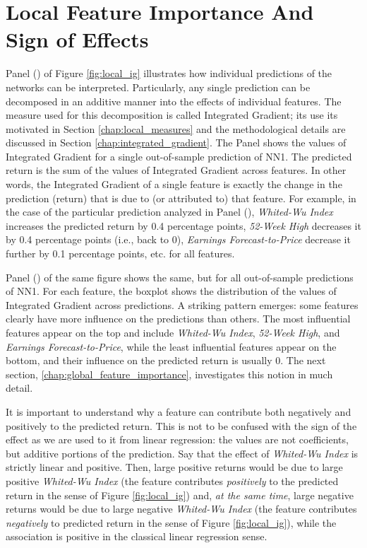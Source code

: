 \section {Local Feature Importance And Sign of Effects}
	\label{chap:local_feature_importance}

	Panel () of Figure \ref{fig:local_ig} illustrates how individual predictions of the networks can be interpreted. Particularly, any single prediction can be decomposed in an additive manner into the effects of individual features. The measure used for this decomposition is called Integrated Gradient; its use its motivated in Section \ref{chap:local_measures} and the methodological details are discussed in Section \ref{chap:integrated_gradient}. The Panel shows the values of Integrated Gradient for a single out-of-sample prediction of NN1. The predicted return is the sum of the values of Integrated Gradient across features. In other words, the Integrated Gradient of a single feature is exactly the change in the prediction (return) that is due to (or attributed to) that feature. For example, in the case of the particular prediction analyzed in Panel (),\textit{ Whited-Wu Index} increases the predicted return by 0.4 percentage points, \textit{52-Week High} decreases it by 0.4 percentage points (i.e., back to 0), \textit{Earnings Forecast-to-Price} decrease it further by 0.1 percentage points, etc. for all features. 
	
	Panel () of the same figure shows the same, but for all out-of-sample predictions of NN1. For each feature, the boxplot shows the distribution of the values of Integrated Gradient across predictions. 
	A striking pattern emerges: some features clearly have more influence on the predictions than others. The most influential features appear on the top and include \textit{Whited-Wu Index}, \textit{52-Week High}, and \textit{Earnings Forecast-to-Price}, while the least influential features appear on the bottom, and their influence on the predicted return is usually 0. The next section, \ref{chap:global_feature_importance}, investigates this notion in much detail. 
	
	It is important to understand why a feature can contribute both negatively and positively to the predicted return. This is not to be confused with the sign of the effect as we are used to it from linear regression: the values are not coefficients, but additive portions of the prediction. Say that the effect of \textit{Whited-Wu Index} is strictly linear and positive. Then, large positive returns would be due to large positive\textit{ Whited-Wu Index} (the feature contributes \textit{positively} to the predicted return in the sense of Figure \ref{fig:local_ig}) and, \textit{at the same time}, large negative returns would be due to large negative \textit{Whited-Wu Index} (the feature contributes \textit{negatively} to predicted return in the sense of Figure \ref{fig:local_ig}), while the association is positive in the classical linear regression sense. 
		
